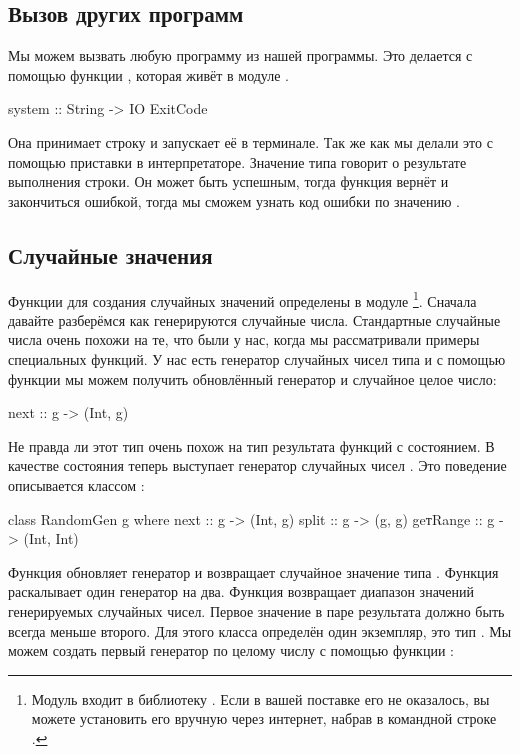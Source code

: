 \subsection{Вызов других программ}

Мы можем вызвать любую программу из нашей программы. 
Это делается с помощью функции , которая 
живёт в модуле . 

\begin{code}
system :: String -> IO ExitCode
\end{code}

Она принимает строку и запускает её в терминале. Так же
как мы делали это с помощью приставки \In{:!} в интерпретаторе.
Значение типа  говорит о результате выполнения 
строки. Он может быть успешным, тогда функция вернёт 
 и закончиться ошибкой, тогда мы сможем
узнать код ошибки по значению .

\subsection{Случайные значения}

Функции для создания случайных значений определены в
модуле %
\footnote{Модуль  входит в библиотеку .%
Если в вашей поставке  его не оказалось, вы можете
установить его вручную через интернет, набрав в командной строке .}. 
Сначала давайте разберёмся как генерируются
случайные числа.
Стандартные случайные числа очень похожи на те, что были
у нас, когда мы рассматривали примеры специальных функций. 
У нас есть генератор случайных чисел типа  и с помощью функции
 мы можем получить обновлённый генератор и
случайное целое число:

\begin{code}
next :: g -> (Int, g)
\end{code}

Не правда ли этот тип очень похож на тип результата
функций с состоянием. В качестве состояния теперь выступает
генератор случайных чисел . Это поведение 
описывается классом :

\begin{code}
class RandomGen g where
    next     :: g -> (Int, g)
    split    :: g -> (g, g)
    geтRange :: g -> (Int, Int)
\end{code}

Функция  обновляет генератор и возвращает случайное
значение типа . Функция  раскалывает один
генератор на два. Функция  возвращает диапазон
значений генерируемых случайных чисел. Первое значение в паре
результата  должно быть всегда меньше второго. 
Для этого класса определён один экземпляр, это тип .
Мы можем создать первый генератор по целому числу с помощью
функции :

